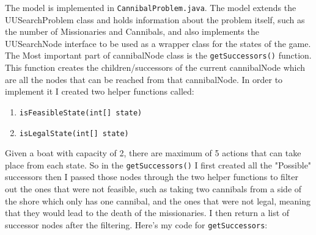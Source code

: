 \documentclass{article}
\begin{document}
The model is implemented in
\verb`CannibalProblem.java`. The model extends the UUSearchProblem class and holds information about the problem itself, such as the number of Missionaries and Cannibals, and also implements the UUSearchNode interface to be used as a wrapper class for the states of the game. The Most important part of cannibalNode class is the \verb`getSuccessors()` function. This function creates the children/successors of the current cannibalNode which are all the nodes that can be reached from that cannibalNode. In order to implement it I created two helper functions called:
\begin{enumerate}
\item \verb`isFeasibleState(int[] state)`
\item \verb`isLegalState(int[] state)`
\end{enumerate}

Given a boat with capacity of 2, there are maximum of 5 actions that can take place from each state. So in the \verb`getSuccessors()` I first created all the "Possible" successors then I passed those nodes through the two helper functions to filter out the ones that were not feasible, such as taking two cannibals from a side of the shore which only has one cannibal, and the ones that were not legal, meaning that they would lead to the death of the missionaries. I then return a list of successor nodes after the filtering.
Here's my code for \verb`getSuccessors`:
\end{document}
